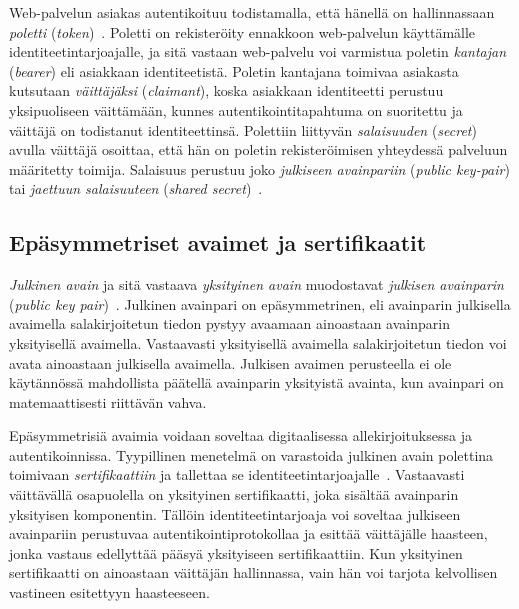 \documentclass[finnish,gradu]{tktltiki}
\begin{document}

  Web-palvelun asiakas autentikoituu todistamalla, että hänellä on hallinnassaan \emph{poletti} (\emph{token})~\cite{NIST_SP800-63-1}. Poletti on rekisteröity ennakkoon web-palvelun käyttämälle identiteetintarjoajalle, ja sitä vastaan web-palvelu voi varmistua poletin \emph{kantajan} (\emph{bearer}) eli asiakkaan identiteetistä. Poletin kantajana toimivaa asiakasta kutsutaan \emph{väittäjäksi} (\emph{claimant}), koska asiakkaan identiteetti perustuu yksipuoliseen väittämään, kunnes autentikointitapahtuma on suoritettu ja väittäjä on todistanut identiteettinsä. Polettiin liittyvän \emph{salaisuuden} (\emph{secret}) avulla väittäjä osoittaa, että hän on poletin rekisteröimisen yhteydessä palveluun määritetty toimija. Salaisuus perustuu joko \emph{julkiseen avainpariin} (\emph{public key-pair}) tai \emph{jaettuun salaisuuteen} (\emph{shared secret})~\cite{NIST_SP800-63-1}.


  \subsection{Epäsymmetriset avaimet ja sertifikaatit} %
  \label{sub:pki}

  \emph{Julkinen avain} ja sitä vastaava \emph{yksityinen avain} muodostavat \emph{julkisen avainparin} (\emph{public key pair})~\cite{NIST_SP800-63-1}. Julkinen avainpari on epäsymmetrinen, eli avainparin julkisella avaimella salakirjoitetun tiedon pystyy avaamaan ainoastaan avainparin yksityisellä avaimella. Vastaavasti yksityisellä avaimella salakirjoitetun tiedon voi avata ainoastaan julkisella avaimella. Julkisen avaimen perusteella ei ole käytännössä mahdollista päätellä avainparin yksityistä avainta, kun avainpari on matemaattisesti riittävän vahva.

  Epäsymmetrisiä avaimia voidaan soveltaa digitaalisessa allekirjoituksessa ja autentikoinnissa. Tyypillinen menetelmä on varastoida julkinen avain polettina toimivaan \emph{sertifikaattiin} ja tallettaa se identiteetintarjoajalle~\cite{NIST_SP800-63-1}. Vastaavasti väittävällä osapuolella on yksityinen sertifikaatti, joka sisältää avainparin yksityisen komponentin. Tällöin identiteetintarjoaja voi soveltaa julkiseen avainpariin perustuvaa autentikointiprotokollaa ja esittää väittäjälle haasteen, jonka vastaus edellyttää pääsyä yksityiseen sertifikaattiin. Kun yksityinen sertifikaatti on ainoastaan väittäjän hallinnassa, vain hän voi tarjota kelvollisen vastineen esitettyyn haasteeseen.
\end{document}
